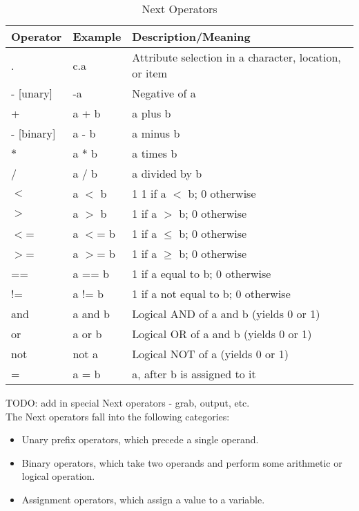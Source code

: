 \documentclass[12pt]{article}
\begin{document}
\begin{table}[htdp]
\caption{Next Operators}
\begin{center}
\begin{tabular}{|l|l|l|}
\hline
\textbf{Operator} & \textbf{Example} & \textbf{Description/Meaning} \\
\hline
.&c.a&Attribute selection in a character, location, or item \\
\hline
- [unary]& -a&Negative of a \\
\hline
+ & a + b & a plus b \\
- [binary]& a - b & a minus b\\
$*$ & a * b & a times b \\
/ & a / b & a divided by b \\
\hline
$<$ & a $<$ b & 1 1 if a $<$ b; 0 otherwise \\
$>$ & a $>$ b & 1 if a $>$ b; 0 otherwise \\
$<$= & a $<$= b& 1 if a $\leq$ b; 0 otherwise\\
$>$=& a $>$= b & 1 if a $\geq$ b; 0 otherwise \\
== & a == b& 1 if a equal to b; 0 otherwise \\
!= & a != b & 1 if a not equal to b; 0 otherwise \\
\hline
and & a and b & Logical AND of a and b (yields 0 or 1) \\
or & a or b & Logical OR of a and b (yields 0 or 1) \\
not & not a & Logical NOT of a (yields 0 or 1) \\
\hline
= & a = b & a, after b is assigned to it \\
\hline
\end{tabular}
\end{center}
\label{operators}
\end{table}%

TODO: add in special Next operators - grab, output, etc. \\

The Next operators fall into the following categories:
\begin{itemize}
\item Unary prefix operators, which precede a single operand.
\item Binary operators, which take two operands and perform some arithmetic or logical operation.
\item Assignment operators, which assign a value to a variable.
\end{itemize}
\end{document}
